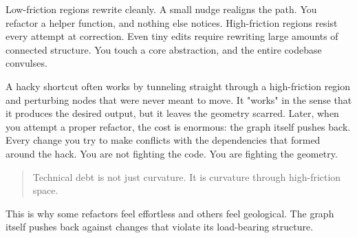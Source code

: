 Low-friction regions rewrite cleanly. A small nudge realigns the path. You refactor a helper
function, and nothing else notices. High-friction regions resist every attempt at correction. Even
tiny edits require rewriting large amounts of connected structure. You touch a core abstraction, and
the entire codebase convulses.

A hacky shortcut often works by tunneling straight through a high-friction region and perturbing
nodes that were never meant to move. It "works" in the sense that it produces the desired output, but
it leaves the geometry scarred. Later, when you attempt a proper refactor, the cost is enormous: the
graph itself pushes back. Every change you try to make conflicts with the dependencies that formed
around the hack. You are not fighting the code. You are fighting the geometry.

\begin{quote}
Technical debt is not just curvature. It is curvature through high-friction space.
\end{quote}

This is why some refactors feel effortless and others feel geological. The graph itself
pushes back against changes that violate its load-bearing structure.

